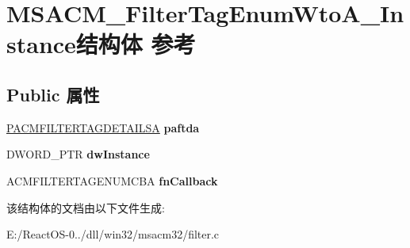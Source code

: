 \hypertarget{struct_m_s_a_c_m___filter_tag_enum_wto_a___instance}{}\section{M\+S\+A\+C\+M\+\_\+\+Filter\+Tag\+Enum\+Wto\+A\+\_\+\+Instance结构体 参考}
\label{struct_m_s_a_c_m___filter_tag_enum_wto_a___instance}
\subsection*{Public 属性}
\begin{DoxyCompactItemize}
\item 
\mbox{\label{struct_m_s_a_c_m___filter_tag_enum_wto_a___instance_af72210424d84d3137d4d0f687b94910d}} 
\hyperlink{struct___a_c_m_f_i_l_t_e_r_t_a_g_d_e_t_a_i_l_s_a}{P\+A\+C\+M\+F\+I\+L\+T\+E\+R\+T\+A\+G\+D\+E\+T\+A\+I\+L\+SA} {\bfseries paftda}
\item 
\mbox{\label{struct_m_s_a_c_m___filter_tag_enum_wto_a___instance_a5be41c3ea846ee98cf376b3615ae3947}} 
D\+W\+O\+R\+D\+\_\+\+P\+TR {\bfseries dw\+Instance}
\item 
\mbox{\label{struct_m_s_a_c_m___filter_tag_enum_wto_a___instance_adb9d3088d0505a0f1a16213d15850f5a}} 
A\+C\+M\+F\+I\+L\+T\+E\+R\+T\+A\+G\+E\+N\+U\+M\+C\+BA {\bfseries fn\+Callback}
\end{DoxyCompactItemize}


该结构体的文档由以下文件生成\+:\begin{DoxyCompactItemize}
\item 
E\+:/\+React\+O\+S-\/0../dll/win32/msacm32/filter.\+c\end{DoxyCompactItemize}
